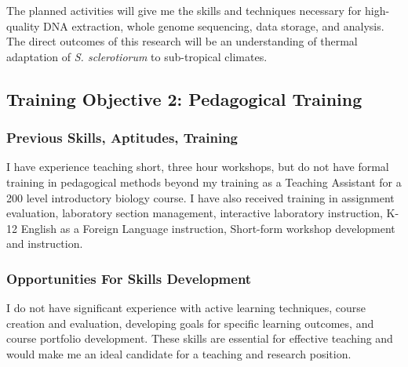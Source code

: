 \documentclass[12pt,letterpaper]{article}
\begin{document}
The planned activities will give me the skills and techniques necessary for high-quality DNA extraction, whole genome sequencing, data storage, and analysis. The direct outcomes of this research will be an understanding of thermal adaptation of \textit{S. sclerotiorum} to sub-tropical climates.

\subsection{Training Objective 2: Pedagogical Training}

\subsubsection*{Previous Skills, Aptitudes, Training}

I have experience teaching short, three hour workshops, but do not have formal training in pedagogical methods beyond my training as a Teaching Assistant for a 200 level introductory biology course. 
I have also received training in assignment evaluation, laboratory section management, interactive laboratory instruction, K-12 English as a Foreign Language instruction, Short-form workshop development and instruction.



\subsubsection*{Opportunities For Skills Development}

I do not have significant experience with active learning techniques, course creation and evaluation, developing goals for specific learning outcomes, and course portfolio development. 
These skills are essential for effective teaching and would make me an ideal candidate for a teaching and research position.
\end{document}
